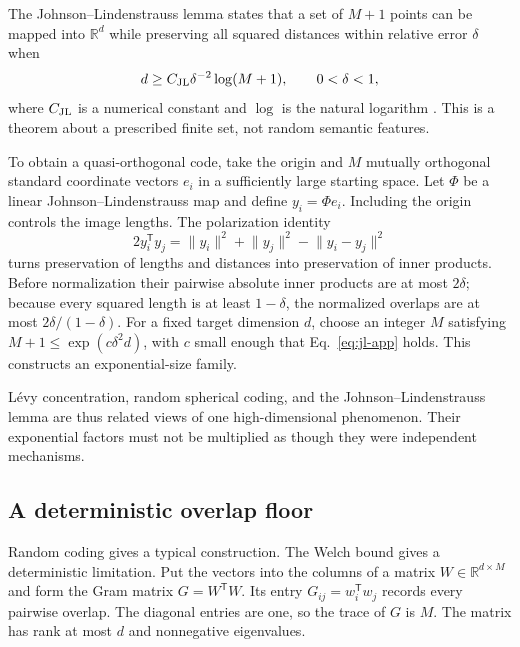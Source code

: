 \documentclass[
  aps,
  reprint,
  superscriptaddress,
  floatfix,
  nofootinbib,
  longbibliography
]{revtex4-2}
\newcommand{\R}{\mathbb{R}}
\newcommand{\T}{^{\mathsf T}}
\newcommand{\norm}[1]{\lVert #1\rVert}
\begin{document}
The Johnson--Lindenstrauss lemma states that a set of $M+1$ points can be mapped
into $\R^d$ while preserving all squared distances within relative error
$\delta$ when
\begin{equation}
 d\geq C_{\rm JL}\delta^{-2}\log(M+1),
 \qquad 0<\delta<1,
 \label{eq:jl-app}
\end{equation}
where $C_{\rm JL}$ is a numerical constant and $\log$ is the natural logarithm
\cite{johnson-1984,Dasgupta-2003}.  This is a theorem about a prescribed finite
set, not random semantic features.

To obtain a quasi-orthogonal code, take the origin and $M$ mutually orthogonal
standard coordinate vectors $e_i$ in a sufficiently large starting space.
Let $\Phi$ be a linear Johnson--Lindenstrauss map and define
$y_i=\Phi e_i$.  Including the origin controls the image lengths.  The
polarization identity
\begin{equation}
 2y_i\T y_j=\norm{y_i}^2+\norm{y_j}^2-\norm{y_i-y_j}^2
 \label{eq:polarization-app}
\end{equation}
turns preservation of lengths and distances into preservation of inner
products.  Before normalization their pairwise absolute inner products are at
most $2\delta$; because every squared length is at least $1-\delta$, the
normalized overlaps are at most $2\delta/(1-\delta)$.  For a fixed target
dimension $d$, choose an integer $M$ satisfying
$M+1\leq\exp(c\delta^2d)$, with $c$ small enough that
Eq.~\eqref{eq:jl-app} holds.  This constructs an exponential-size family.

L\'evy concentration, random spherical coding, and the
Johnson--Lindenstrauss lemma are thus related views of one high-dimensional
phenomenon.  Their exponential factors must not be multiplied as though they
were independent mechanisms.

\subsection{A deterministic overlap floor}

Random coding gives a typical construction.  The Welch bound gives a
deterministic limitation.  Put the vectors into the columns of a matrix
$W\in\R^{d\times M}$ and form the Gram matrix $G=W\T W$.  Its entry
$G_{ij}=w_i\T w_j$ records every pairwise overlap.  The diagonal entries are
one, so the trace of $G$ is $M$.  The matrix has rank at most $d$ and
nonnegative eigenvalues.
\end{document}
